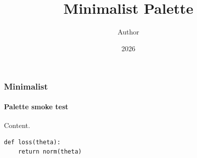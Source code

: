 \documentclass[notheorems,aspectratio=169]{beamer}
\title{Minimalist Palette}
\author{Author}
\date{2026}
\begin{document}
\maketitle

\begin{frame}[fragile]
  \frametitle{Minimalist}
  \framesubtitle{Palette smoke test}

  Content.

  \begin{verbatim}
def loss(theta):
    return norm(theta)
  \end{verbatim}
\end{frame}
\end{document}
